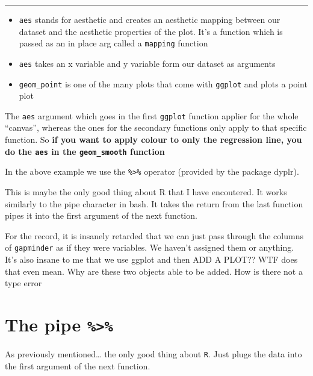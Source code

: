 \documentclass[
]{report}
\providecommand{\tightlist}{%
  \setlength{\itemsep}{0pt}\setlength{\parskip}{0pt}}
\renewenvironment{quote}{
	\bigskip\begin{mdframed}[
			skipabove=\topskip,
			skipbelow=\topskip,
			backgroundcolor=quoteshadecolor,
			leftmargin=0.5cm,
			rightmargin=0.5cm,
			topline=false,
			rightline=false,
			bottomline=false,
			nobreak=true,
		]\itshape%
		}{
	\end{mdframed}
}
\theoremstyle{definition}
\theoremstyle{definition}
\theoremstyle{definition}
\theoremstyle{definition}
\theoremstyle{remark}
\begin{document}
\begin{center}\rule{0.5\linewidth}{0.5pt}\end{center}

\begin{itemize}
\tightlist
\item
  \texttt{aes} stands for aesthetic and creates an aesthetic mapping between our
  dataset and the aesthetic properties of the plot. It's a function which is
  passed as an in place arg called a \texttt{mapping} function
\item
  \texttt{aes} takes an x variable and y variable form our dataset as arguments
\item
  \texttt{geom\_point} is one of the many plots that come with \texttt{ggplot} and plots a
  point plot
\end{itemize}

\begin{quote}
The \texttt{aes} argument which goes in the first \texttt{ggplot} function applier for the
whole ``canvas'', whereas the ones for the secondary functions only apply to
that specific function. So \textbf{if you want to apply colour to only the
regression line, you do the \texttt{aes} in the \texttt{geom\_smooth} function}
\end{quote}

In the above example we use the \texttt{\%\textgreater{}\%} operator (provided by the package dyplr).

This is maybe the only good thing about R that I have encoutered. It works
similarly to the pipe character in bash. It takes the return from the last
function pipes it into the first argument of the next function.

\begin{quote}
For the record, it is insanely retarded that we can just pass through the
columns of \texttt{gapminder} as if they were variables. We haven't assigned them or
anything. It's also insane to me that we use ggplot and then ADD A PLOT?? WTF
does that even mean. Why are these two objects able to be added. How is there
not a type error
\end{quote}

\hypertarget{the-pipe}{%
\section{\texorpdfstring{The pipe \texttt{\%\textgreater{}\%}}{The pipe \%\textgreater\%}}\label{the-pipe}}

As previously mentioned\ldots{} the only good thing about \texttt{R}. Just plugs the data
into the first argument of the next function.
\end{document}
